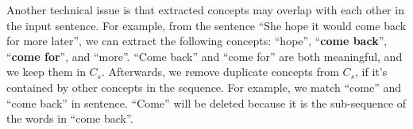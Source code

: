 Another technical issue is that extracted concepts may overlap with 
each other in the input sentence. For example, from the sentence 
``She hope it would come back for more later'', we can extract the following
concepts: ``hope'', ``\textbf{come back}'', ``\textbf{come for}'', 
and ``more''. ``Come back'' and ``come for'' are both meaningful, and we keep 
them in $C_s$.
Afterwards, we remove duplicate concepts from $C_s$,
if it's contained by other concepts in the sequence. 
For example, we match ``come'' and ``come back'' in sentence. 
``Come'' will be deleted because it is the sub-sequence of the words in ``come back''. 





